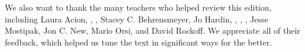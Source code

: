\noindent%
We also want to thank the many teachers who helped review
this edition, including
Laura Acion,
,
,
Stacey C. Behrensmeyer,
Jo Hardin,
,
,
,
Jesse Mostipak,
Jon C. New,
Mario Orsi,
and David Rockoff.
We appreciate all of their feedback, which helped
us tune the text in significant ways for the better.
